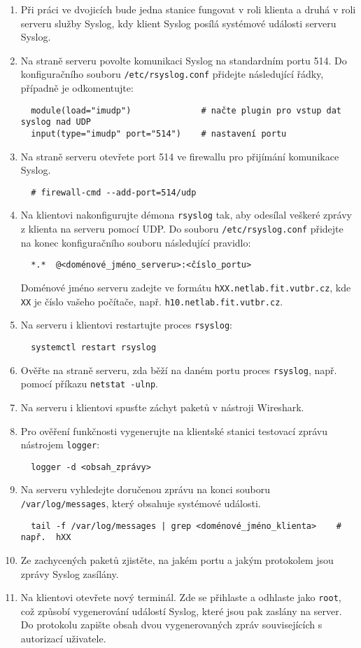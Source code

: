 \documentclass[a4paper,11pt]{article}
\begin{document}
\begin{enumerate}
  \item Při práci ve dvojicích bude jedna stanice fungovat v roli klienta a druhá v roli serveru služby Syslog, kdy klient Syslog posílá systémové události serveru Syslog.
  \item Na straně serveru povolte komunikaci Syslog na standardním portu 514. Do konfiguračního souboru {\tt /etc/rsyslog.conf} přidejte následující řádky, případně je odkomentujte:
    \vspace{-2mm}
\begin{verbatim}
  module(load="imudp")              # načte plugin pro vstup dat syslog nad UDP
  input(type="imudp" port="514")    # nastavení portu
\end{verbatim}
  \item Na straně serveru otevřete port 514 ve firewallu pro přijímání komunikace Syslog.
\begin{verbatim}
  # firewall-cmd --add-port=514/udp
\end{verbatim}
  \item  Na klientovi nakonfigurujte démona {\tt rsyslog} tak, aby odesílal veškeré zprávy z klienta na serveru pomocí UDP.
    Do souboru {\tt /etc/rsyslog.conf} přidejte na konec konfiguračního souboru následující pravidlo:
\begin{verbatim} 
  *.*  @<doménové_jméno_serveru>:<číslo_portu>
\end{verbatim}
    {\small Doménové jméno serveru zadejte ve formátu \texttt{hXX.netlab.fit.vutbr.cz}, kde \texttt{XX} je číslo vašeho počítače, např. \texttt{h10.netlab.fit.vutbr.cz}.}
  \item Na serveru i klientovi restartujte proces {\tt rsyslog}: 
\begin{verbatim}
  systemctl restart rsyslog
\end{verbatim} 
  \item Ověřte na straně serveru, zda běží na daném portu proces {\tt rsyslog}, např. pomocí příkazu \verb|netstat -ulnp|.
  \item Na serveru i klientovi spusťte záchyt paketů v nástroji Wireshark. 
  \item Pro ověření funkčnosti vygenerujte na klientské stanici testovací zprávu nástrojem {\tt logger}:
\begin{verbatim} 
  logger -d <obsah_zprávy>
\end{verbatim} 
  \item Na serveru vyhledejte doručenou zprávu na konci souboru {\tt /var/log/messages}, který obsahuje
        systémové události.
\begin{verbatim} 
  tail -f /var/log/messages | grep <doménové_jméno_klienta>    # např.  hXX
\end{verbatim} 
  \item Ze zachycených paketů zjistěte, na jakém portu a jakým protokolem jsou zprávy Syslog zasílány.
  \item Na klientovi otevřete nový terminál. Zde se přihlaste a odhlaste jako {\tt root}, což způsobí vygenerování událostí Syslog, které jsou pak zaslány na server. Do protokolu zapište obsah dvou vygenerovaných zpráv souvisejících s autorizací uživatele.
\end{enumerate}
\end{document}
